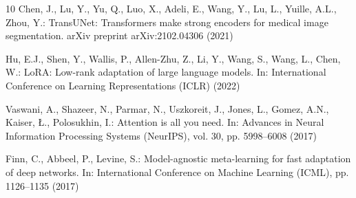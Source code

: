 \documentclass[runningheads]{llncs}
\begin{document}
\begin{thebibliography}{10}
Chen, J., Lu, Y., Yu, Q., Luo, X., Adeli, E., Wang, Y., Lu, L., Yuille, A.L., Zhou, Y.: TransUNet: Transformers make strong encoders for medical image segmentation. arXiv preprint arXiv:2102.04306 (2021)

Hu, E.J., Shen, Y., Wallis, P., Allen-Zhu, Z., Li, Y., Wang, S., Wang, L., Chen, W.: LoRA: Low-rank adaptation of large language models. In: International Conference on Learning Representations (ICLR) (2022)

Vaswani, A., Shazeer, N., Parmar, N., Uszkoreit, J., Jones, L., Gomez, A.N., Kaiser, {\L}., Polosukhin, I.: Attention is all you need. In: Advances in Neural Information Processing Systems (NeurIPS), vol. 30, pp. 5998--6008 (2017)

Finn, C., Abbeel, P., Levine, S.: Model-agnostic meta-learning for fast adaptation of deep networks. In: International Conference on Machine Learning (ICML), pp. 1126--1135 (2017)
\end{thebibliography}
\end{document}
